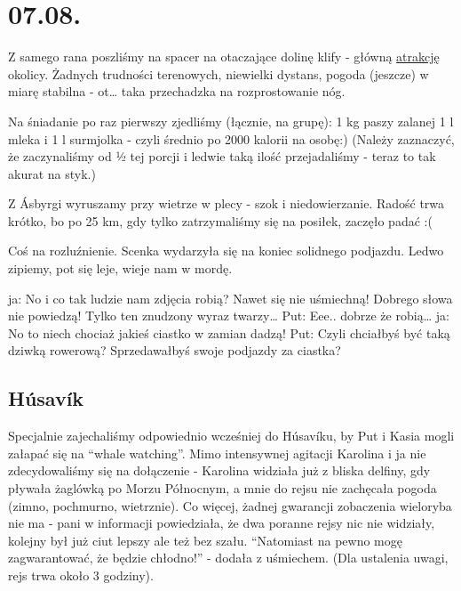 \chapter*{07.08.}

Z samego rana poszliśmy na spacer na otaczające dolinę klify - główną \href{http://www.visithusavik.com/attractions/asbyrgi-canyon/}{atrakcję} okolicy. Żadnych trudności terenowych, niewielki dystans, pogoda (jeszcze) w miarę stabilna - ot… taka przechadzka na rozprostowanie nóg.

Na śniadanie po raz pierwszy zjedliśmy (łącznie, na grupę): 1 kg paszy zalanej 1 l mleka i 1 l surmjolka - czyli średnio po 2000 kalorii na osobę:) (Należy zaznaczyć, że zaczynaliśmy od ½ tej porcji i ledwie taką ilość przejadaliśmy - teraz to tak akurat na styk.)


Z Ásbyrgi wyruszamy przy wietrze w plecy - szok i niedowierzanie. Radość trwa krótko, bo po 25 km, gdy tylko zatrzymaliśmy się na posiłek, zaczęło padać :(

Coś na rozluźnienie. Scenka wydarzyła się na koniec solidnego podjazdu. Ledwo zipiemy, pot się leje, wieje nam w mordę.

ja: No i co tak ludzie nam zdjęcia robią? Nawet się nie uśmiechną! Dobrego słowa nie powiedzą! Tylko ten znudzony wyraz twarzy…
Put: Eee.. dobrze że robią…
ja: No to niech chociaż jakieś ciastko w zamian dadzą!
Put: Czyli chciałbyś być taką dziwką rowerową? Sprzedawałbyś swoje podjazdy za ciastka?

\section*{Húsavík}

Specjalnie zajechaliśmy odpowiednio wcześniej do Húsavíku, by Put i Kasia mogli załapać się na “whale watching”. Mimo intensywnej agitacji Karolina i ja nie zdecydowaliśmy się na dołączenie - Karolina widziała już z bliska delfiny, gdy pływała żaglówką po Morzu Północnym, a mnie do rejsu nie zachęcała pogoda (zimno, pochmurno, wietrznie). Co więcej, żadnej gwarancji zobaczenia wieloryba nie ma - pani w informacji powiedziała, że dwa poranne rejsy nic nie widziały, kolejny był już ciut lepszy ale też bez szału. “Natomiast na pewno mogę zagwarantować, że będzie chłodno!” - dodała z uśmiechem. (Dla ustalenia uwagi, rejs trwa około 3 godziny).

